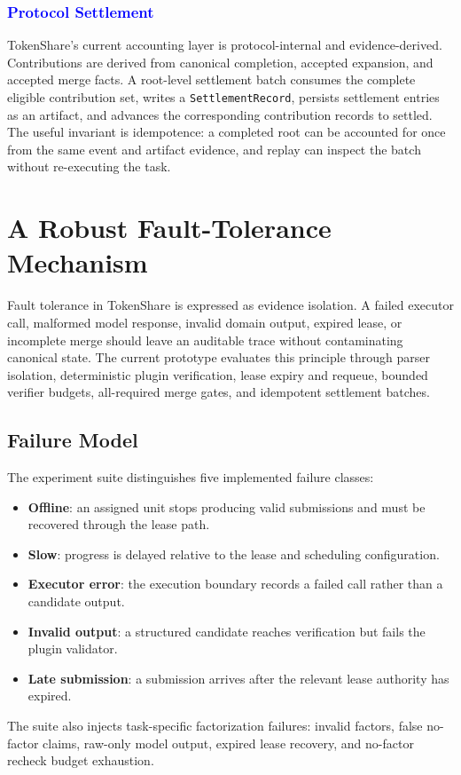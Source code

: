 \documentclass{article}
\theoremstyle{plain}
\begin{document}
\subsubsection{\textcolor{blue}{Protocol Settlement}}

{\color{blue}
TokenShare's current accounting layer is protocol-internal and evidence-derived. Contributions are derived from canonical completion, accepted expansion, and accepted merge facts. A root-level settlement batch consumes the complete eligible contribution set, writes a \texttt{SettlementRecord}, persists settlement entries as an artifact, and advances the corresponding contribution records to settled. The useful invariant is idempotence: a completed root can be accounted for once from the same event and artifact evidence, and replay can inspect the batch without re-executing the task.
}




\section{A Robust Fault-Tolerance Mechanism}

{\color{blue}
Fault tolerance in TokenShare is expressed as evidence isolation. A failed executor call, malformed model response, invalid domain output, expired lease, or incomplete merge should leave an auditable trace without contaminating canonical state. The current prototype evaluates this principle through parser isolation, deterministic plugin verification, lease expiry and requeue, bounded verifier budgets, all-required merge gates, and idempotent settlement batches.
}

\subsection{Failure Model}

{\color{blue}
The experiment suite distinguishes five implemented failure classes:
\begin{itemize}
\item \textbf{Offline}: an assigned unit stops producing valid submissions and must be recovered through the lease path.
\item \textbf{Slow}: progress is delayed relative to the lease and scheduling configuration.
\item \textbf{Executor error}: the execution boundary records a failed call rather than a candidate output.
\item \textbf{Invalid output}: a structured candidate reaches verification but fails the plugin validator.
\item \textbf{Late submission}: a submission arrives after the relevant lease authority has expired.
\end{itemize}
The suite also injects task-specific factorization failures: invalid factors, false no-factor claims, raw-only model output, expired lease recovery, and no-factor recheck budget exhaustion.
}
\end{document}
